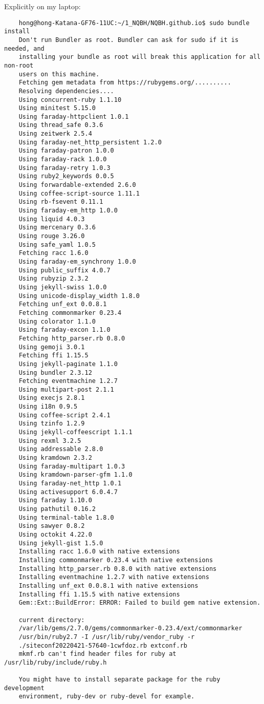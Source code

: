 \documentclass{article}
\numberwithin{equation}{section}
\begin{document}
Explicitly on my laptop:
\begin{verbatim}
	hong@hong-Katana-GF76-11UC:~/1_NQBH/NQBH.github.io$ sudo bundle install
	Don't run Bundler as root. Bundler can ask for sudo if it is needed, and
	installing your bundle as root will break this application for all non-root
	users on this machine.
	Fetching gem metadata from https://rubygems.org/..........
	Resolving dependencies....
	Using concurrent-ruby 1.1.10
	Using minitest 5.15.0
	Using faraday-httpclient 1.0.1
	Using thread_safe 0.3.6
	Using zeitwerk 2.5.4
	Using faraday-net_http_persistent 1.2.0
	Using faraday-patron 1.0.0
	Using faraday-rack 1.0.0
	Using faraday-retry 1.0.3
	Using ruby2_keywords 0.0.5
	Using forwardable-extended 2.6.0
	Using coffee-script-source 1.11.1
	Using rb-fsevent 0.11.1
	Using faraday-em_http 1.0.0
	Using liquid 4.0.3
	Using mercenary 0.3.6
	Using rouge 3.26.0
	Using safe_yaml 1.0.5
	Fetching racc 1.6.0
	Using faraday-em_synchrony 1.0.0
	Using public_suffix 4.0.7
	Using rubyzip 2.3.2
	Using jekyll-swiss 1.0.0
	Using unicode-display_width 1.8.0
	Fetching unf_ext 0.0.8.1
	Fetching commonmarker 0.23.4
	Using colorator 1.1.0
	Using faraday-excon 1.1.0
	Fetching http_parser.rb 0.8.0
	Using gemoji 3.0.1
	Fetching ffi 1.15.5
	Using jekyll-paginate 1.1.0
	Using bundler 2.3.12
	Fetching eventmachine 1.2.7
	Using multipart-post 2.1.1
	Using execjs 2.8.1
	Using i18n 0.9.5
	Using coffee-script 2.4.1
	Using tzinfo 1.2.9
	Using jekyll-coffeescript 1.1.1
	Using rexml 3.2.5
	Using addressable 2.8.0
	Using kramdown 2.3.2
	Using faraday-multipart 1.0.3
	Using kramdown-parser-gfm 1.1.0
	Using faraday-net_http 1.0.1
	Using activesupport 6.0.4.7
	Using faraday 1.10.0
	Using pathutil 0.16.2
	Using terminal-table 1.8.0
	Using sawyer 0.8.2
	Using octokit 4.22.0
	Using jekyll-gist 1.5.0
	Installing racc 1.6.0 with native extensions
	Installing commonmarker 0.23.4 with native extensions
	Installing http_parser.rb 0.8.0 with native extensions
	Installing eventmachine 1.2.7 with native extensions
	Installing unf_ext 0.0.8.1 with native extensions
	Installing ffi 1.15.5 with native extensions
	Gem::Ext::BuildError: ERROR: Failed to build gem native extension.
	
	current directory:
	/var/lib/gems/2.7.0/gems/commonmarker-0.23.4/ext/commonmarker
	/usr/bin/ruby2.7 -I /usr/lib/ruby/vendor_ruby -r
	./siteconf20220421-57640-1cwfdoz.rb extconf.rb
	mkmf.rb can't find header files for ruby at /usr/lib/ruby/include/ruby.h
	
	You might have to install separate package for the ruby development
	environment, ruby-dev or ruby-devel for example.
	

\end{verbatim}
\end{document}

